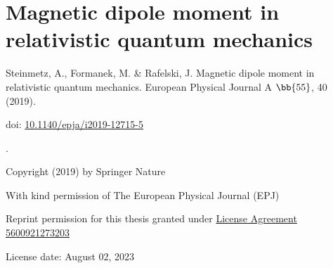



%

\chapter{Magnetic dipole moment in relativistic quantum mechanics}
\begin{center}
Steinmetz, A., Formanek, M. \& Rafelski, J. Magnetic dipole moment in relativistic quantum mechanics. European Physical Journal A $\bb{55}$, 40 (2019).

doi: \href{https://doi.org/10.1140/epja/i2019-12715-5}{10.1140/epja/i2019-12715-5}

.

Copyright (2019) by Springer Nature

With kind permission of The European Physical Journal (EPJ)

Reprint permission for this thesis granted under \href{https://s100.copyright.com/CustomerAdmin/PLF.jsp?ref=9a7a42d0-4511-4427-8acd-73a16083772c}{License Agreement 5600921273203}

License date: August 02, 2023
\end{center}


